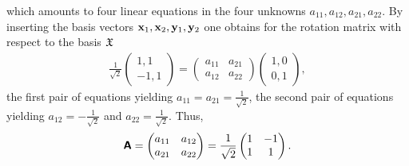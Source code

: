 {\begin{enumerate}
\begin{equation}
\end{equation}
which amounts to four linear equations in the four unknowns $a_{11}, a_{12},
a_{21}, a_{22}$.
By
inserting the basis vectors
$ {\bf x}_1,{\bf x}_2, {\bf y}_1, {\bf y}_2$
one obtains for the rotation matrix with respect to the basis ${\frak X}$
\begin{equation}
\begin{split}
\frac{1}{\sqrt{2}}
\begin{pmatrix}
1,1\\
-1,1
\end{pmatrix}
=
\begin{pmatrix}
a_{11}&a_{21}\\
a_{12}&a_{22}
\end{pmatrix}
\begin{pmatrix}
1,0 \\
0,1
\end{pmatrix}
,
\end{split}
\end{equation}
the first pair of equations yielding
$a_{11}=a_{21}=\frac{1}{\sqrt{2}}$,
the second pair of equations yielding
$a_{12}=-\frac{1}{\sqrt{2}}$ and $a_{22}=\frac{1}{\sqrt{2}}$.
Thus,
\begin{equation}
 \textsf{\textbf{A}}=
\begin{pmatrix}
a_{11}&a_{12}\\
a_{21}&a_{22}
\end{pmatrix}
=
\frac{1}{\sqrt{2}}
\begin{pmatrix}
1&-1\\
1&1
\end{pmatrix}
.
\end{equation}


\end{enumerate}}

